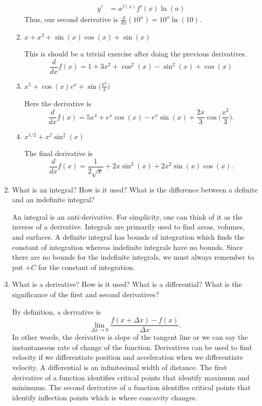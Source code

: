 \begin{enumerate}
\begin{enumerate}[label = (\alph*)]
\begin{align*}
      y' &= a^{f(x)}f'(x)\ln(a)
    \end{align*}
    Thus, our second derivative is \(\frac{d}{dx}(10^x) = 10^x\ln(10)\).
  \item
    \(x + x^3 + \sin(x)\cos(x) + \sin(x)\)
    \par\smallskip
    This is should be a trivial exercise after doing the previous derivatives.
    \[
    \frac{d}{dx}f(x) = 1 + 3x^2 + \cos^2(x) - \sin^2(x) + \cos(x)
    \]
  \item
    \(x^5 + \cos(x)e^x + \sin\big(\frac{x^2}{3}\big)\)
    \par\smallskip
    Here the derivative is
    \[
    \frac{d}{dx}f(x) = 5x^4 + e^x\cos(x) - e^x\sin(x) +
    \frac{2x}{3}\cos\bigg(\frac{x^2}{3}\bigg).
    \]
  \item
    \(x^{1/2} + x^2\sin^2(x)\)
    \par\smallskip
    The final derivative is
    \[
    \frac{d}{dx}f(x) = \frac{1}{2\sqrt{x}} + 2x\sin^2(x) + 2x^2\sin(x)\cos(x).
    \]
  \end{enumerate}
\item
  What is an integral?
  How is it used?
  What is the difference between a definite and an indefinite integral?
  \par\smallskip
  An integral is an anti-derivative.
  For simplicity, one can think of it as the inverse of a derivative.
  Integrals are primarily used to find areas, volumes, and surfaces.
  A definite integral has bounds of integration which finds the constant of
  integration whereas indefinite integrals have no bounds.
  Since there are no bounds for the indefinite integrals, we must always
  remember to put \(+ C\) for the constant of integration.
\item
  What is a derivative?
  How is it used?
  What is a differential?
  What is the significance of the first and second derivatives?
  \par\smallskip
  By definition, a derivative is
  \[
  \lim_{\Delta x\to 0}\frac{f(x + \Delta x) - f(x)}{\Delta x}.
  \]
  In other words, the derivative is slope of the tangent line or we can say the
  instantaneous rate of change of the function.
  Derivatives can be used to find velocity if we differentiate position and
  acceleration when we differentiate velocity.
  A differential is an infinitesimal width of distance.
  The first derivative of a function identifies critical points that identify
  maximum and minimums.
  The second derivative of a function identifies critical points that identify
  inflection points which is where concavity changes.

\end{enumerate}
